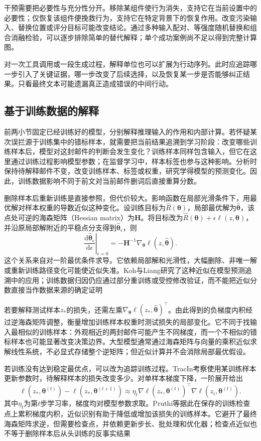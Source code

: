 干预需要把必要性与充分性分开。移除某组件使行为消失，支持它在当前设置中的必要性；仅恢复该组件便挽救行为，支持它在特定背景下的恢复作用。改变污染输入、替换位置或评分目标可能改变结论。通过多种输入配对、等强度随机替换和组合消融检验，可以逐步排除简单的替代解释；单个成功案例尚不足以得到完整计算图。

对一次工具调用或一段生成过程，解释单位也可以扩展为行动序列。此时应追踪哪一步引入了关键证据，哪一步改变了后续选择，以及恢复某一步是否能够纠正结果。只看最终文本可能遗漏真正造成错误的中间行动。

\subsection{基于训练数据的解释}
\label{sec:interpretability-local-training}

前两小节固定已经训练好的模型，分别解释推理输入的作用和内部计算。若怀疑某次误拦源于训练集中的错标样本，就需要把当前结果追溯到学习阶段：改变哪些训练样本后，模型对这封邮件的判断会发生变化？训练样本同样包含输入，但它在这里通过训练过程影响模型参数；在监督学习中，样本标签也参与这种影响。分析时保持待解释邮件不变，改变训练样本、标签或权重，研究学得模型的预测变化。因此，训练数据影响不同于前文对当前邮件删词后直接重算分数。

删除样本后重新训练是直接参照，但代价较大。影响函数在局部光滑条件下，用最优解对样本权重的导数近似这种变化。设训练目标为$\hat R(\bm{\theta})$，局部最优解为$\hat{\bm{\theta}}$，该点处可逆的海森矩阵（Hessian matrix）为$\bm H$。将目标改为$\hat R(\bm{\theta})+\epsilon\ell(z,\bm{\theta})$，并沿原局部解附近的平稳点分支得到$\hat{\bm{\theta}}_\epsilon$，则
\[
 \left.\frac{\mathrm d\hat{\bm{\theta}}_\epsilon}
 {\mathrm d\epsilon}\right|_{\epsilon=0}
 =-\bm H^{-1}\nabla_{\bm{\theta}}
       \ell(z,\hat{\bm{\theta}}).
\]
这个关系来自对一阶最优条件求导。它依赖局部解和光滑性，大幅删除、非唯一解或重新训练路径变化可能使近似失准。Koh与Liang研究了这种近似在模型预测追溯中的应用；训练数据归因仍应通过部分重训练或受控修改验证，而不能把近似分数直接当作数据来源的确定证明

若要解释测试样本$z_*$的损失，还需左乘$\nabla_{\bm\theta}\ell(z_*,\hat{\bm\theta})^\top$。由此得到的负梯度内积经过逆海森矩阵调整，衡量增加训练样本权重时测试损失的局部变化。它不同于找输入最相似的训练样本：外观相近的两封邮件可能产生不同梯度，而一个不相似的错标样本也可能显著改变决策边界。大型模型通常通过海森矩阵与向量的乘积近似求解线性系统，不必显式存储整个逆矩阵；但近似计算并不会消除局部最优假设。

若训练没有达到稳定最优点，可以改为追踪训练过程。TracIn考察使用某训练样本更新参数时，待解释样本的损失改变多少。对单样本梯度下降，一阶展开给出
\[
 \ell(z_*,\bm\theta^{(t)})-\ell(z_*,\bm\theta^{(t+1)})
 \approx\eta_t
 \nabla\ell(z_*,\bm\theta^{(t)})^\top
 \nabla\ell(z_i,\bm\theta^{(t)}).
\]
其中$\eta_t$为第$t$步学习率，梯度均对模型参数求取。Pruthi等据此在保存的训练检查点上累积梯度内积，近似识别有助于降低或增加该损失的训练样本。它避开了最终海森矩阵求逆，但需要检查点，并依赖更新步长、批处理和优化器；检查点近似也不等于删除样本后从头训练的反事实结果

